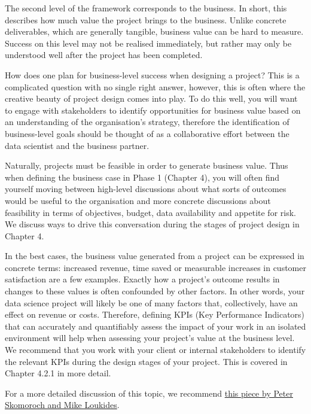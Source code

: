 \documentclass[
]{book}
\begin{document}
The second level of the framework corresponds to the business. In short, this describes how much value the project brings to the business. Unlike concrete deliverables, which are generally tangible, business value can be hard to measure. Success on this level may not be realised immediately, but rather may only be understood well after the project has been completed.

How does one plan for business-level success when designing a project? This is a complicated question with no single right answer, however, this is often where the creative beauty of project design comes into play. To do this well, you will want to engage with stakeholders to identify opportunities for business value based on an understanding of the organisation's strategy, therefore the identification of business-level goals should be thought of as a collaborative effort between the data scientist and the business partner.

Naturally, projects must be feasible in order to generate business value. Thus when defining the business case in Phase 1 (Chapter 4), you will often find yourself moving between high-level discussions about what sorts of outcomes would be useful to the organisation and more concrete discussions about feasibility in terms of objectives, budget, data availability and appetite for risk. We discuss ways to drive this conversation during the stages of project design in Chapter 4.

In the best cases, the business value generated from a project can be expressed in concrete terms: increased revenue, time saved or measurable increases in customer satisfaction are a few examples. Exactly how a project's outcome results in changes to these values is often confounded by other factors. In other words, your data science project will likely be one of many factors that, collectively, have an effect on revenue or costs. Therefore, defining KPIs (Key Performance Indicators) that can accurately and quantifiably assess the impact of your work in an isolated environment will help when assessing your project's value at the business level. We recommend that you work with your client or internal stakeholders to identify the relevant KPIs during the design stages of your project. This is covered in Chapter 4.2.1 in more detail.

For a more detailed discussion of this topic, we recommend \href{https://www.oreilly.com/radar/what-you-need-to-know-about-product-management-for-ai/}{this piece by Peter Skomoroch and Mike Loukides}.
\end{document}
